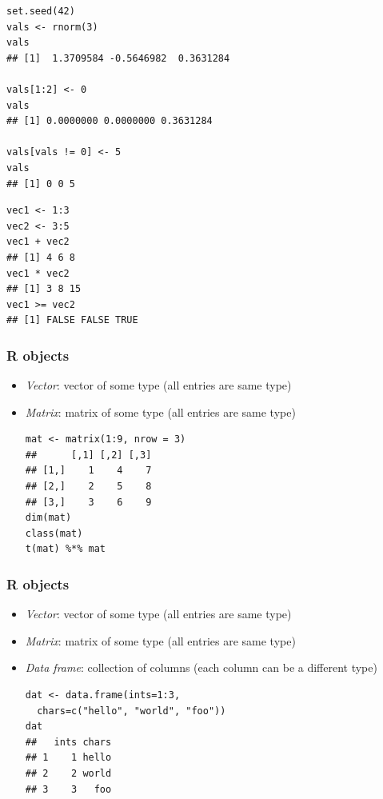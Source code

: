 \documentclass[10pt,c]{beamer}
\newenvironment{changemargin}[1]{
  \begin{list}{}{
    \setlength{\topsep}{0pt}
    \setlength{\leftmargin}{#1}
    \setlength{\rightmargin}{#1}
    \setlength{\listparindent}{\parindent}
    \setlength{\itemindent}{\parindent}
    \setlength{\parsep}{\parskip}
  }
  \item[]}{\end{list}}
\begin{document}
\begin{frame}
\begin{changemargin}{-1.0em}
\begin{lstlisting}
set.seed(42)
vals <- rnorm(3)
vals
## [1]  1.3709584 -0.5646982  0.3631284

vals[1:2] <- 0
vals
## [1] 0.0000000 0.0000000 0.3631284

vals[vals != 0] <- 5
vals
## [1] 0 0 5
\end{lstlisting}
\end{changemargin}
\end{frame}
\begin{frame}
\begin{changemargin}{2.5em}
\begin{lstlisting}
vec1 <- 1:3
vec2 <- 3:5
vec1 + vec2
## [1] 4 6 8
vec1 * vec2
## [1] 3 8 15
vec1 >= vec2
## [1] FALSE FALSE TRUE
\end{lstlisting}
\end{changemargin}
\end{frame}
\begin{frame}[fragile]
\frametitle{R objects}
\begin{itemize}
\item \emph{Vector}: vector of some type (all entries are same type)
\item \emph{Matrix}: matrix of some type (all entries are same type)
\begin{lstlisting}
mat <- matrix(1:9, nrow = 3)
##      [,1] [,2] [,3]
## [1,]    1    4    7
## [2,]    2    5    8
## [3,]    3    6    9
dim(mat)
class(mat)
t(mat) %*% mat
\end{lstlisting}
\end{itemize}
\end{frame}
\begin{frame}[fragile]
\frametitle{R objects}
\begin{itemize}
\item \emph{Vector}: vector of some type (all entries are same type)
\item \emph{Matrix}: matrix of some type (all entries are same type)
\item \emph{Data frame}: collection of columns (each column can be a different type)
\begin{lstlisting}
dat <- data.frame(ints=1:3,
  chars=c("hello", "world", "foo"))
dat
##   ints chars
## 1    1 hello
## 2    2 world
## 3    3   foo
\end{lstlisting}
\end{itemize}
\end{frame}
\end{document}
